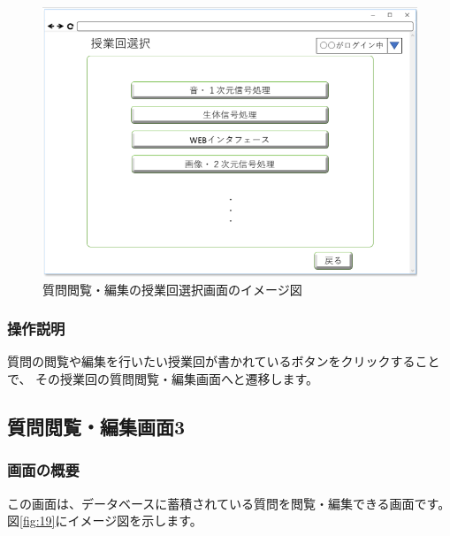 \begin{figure}[htbp]
\begin{center}
  \includegraphics[width=1\linewidth,clip]{./img/18.png}
  \caption{質問閲覧・編集の授業回選択画面のイメージ図}\label{fig:18}
\end{center}
\end{figure}

\subsubsection{操作説明}
質問の閲覧や編集を行いたい授業回が書かれているボタンをクリックすることで、
その授業回の質問閲覧・編集画面へと遷移します。

\newpage

\subsection{質問閲覧・編集画面3}
\subsubsection{画面の概要}
この画面は、データベースに蓄積されている質問を閲覧・編集できる画面です。
図\ref{fig:19}にイメージ図を示します。

